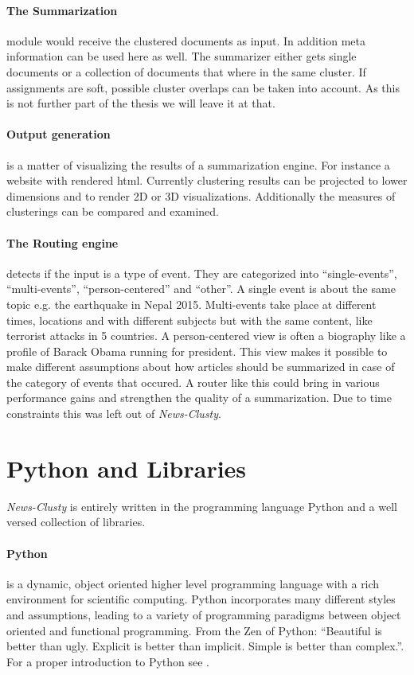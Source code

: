   \paragraph{The Summarization} module would receive the clustered documents as input. In addition meta information can be used here as well. The summarizer either gets single documents or a collection of documents that where in the same cluster. If assignments are soft, possible cluster overlaps can be taken into account. As this is not further part of the thesis we will leave it at that.

  \paragraph{Output generation} is a matter of visualizing the results of a summarization engine. For instance a website with rendered html. Currently clustering results can be projected to lower dimensions and to render 2D or 3D visualizations. Additionally the measures of clusterings can be compared and examined.

  \paragraph{The Routing engine} detects if the input is a type of event. They are categorized into ``single-events'', ``multi-events'', ``person-centered'' and ``other''. A single event is about the same topic e.g. the earthquake in Nepal 2015. Multi-events take place at different times, locations and with different subjects but with the same content, like terrorist attacks in 5 countries. A person-centered view is often a biography like a profile of Barack Obama running for president. This view makes it possible to make different assumptions about how articles should be summarized in case of the category of events that occured. A router like this could bring in various performance gains and strengthen the quality of a summarization. Due to time constraints this was left out of \emph{News-Clusty}.

\section{Python and Libraries}
  \emph{News-Clusty} is entirely written in the programming language Python and a well versed collection of libraries.

  \paragraph{Python} is a dynamic, object oriented higher level programming language with a rich environment for scientific computing. Python incorporates many different styles and assumptions, leading to a variety of programming paradigms between object oriented and functional programming. From the Zen of Python: ``Beautiful is better than ugly. Explicit is better than implicit. Simple is better than complex.''. For a proper introduction to Python see \cite{NltkPython}.

